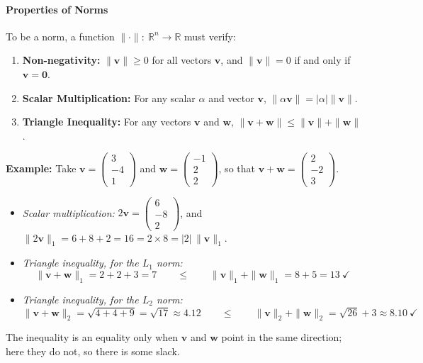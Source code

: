 \documentclass[]{article}
\newcommand{\R}{\mathbb{R}}
\begin{document}
	\paragraph{Properties of Norms}
	To be a norm, a function $\| \cdot \|: \ \R^n \to \R$ must verify:
	\begin{enumerate}
		\item \textbf{Non-negativity:}
		$\|\mathbf{v}\| \geq 0$ for all vectors $\mathbf{v}$, and $\|\mathbf{v}\| = 0$ if and only if $\mathbf{v} = \mathbf{0}$.
		\item \textbf{Scalar Multiplication:}
		For any scalar $\alpha$ and vector $\mathbf{v}$, $\|\alpha \mathbf{v}\| = |\alpha| \|\mathbf{v}\|$.
		\item \textbf{Triangle Inequality:}
		For any vectors $\mathbf{v}$ and $\mathbf{w}$, $\|\mathbf{v} + \mathbf{w}\| \leq \|\mathbf{v}\| + \|\mathbf{w}\|$.
	\end{enumerate}

	\noindent
	\textbf{Example:}
	Take $\mathbf{v} = \begin{pmatrix} 3 \\ -4 \\ 1 \end{pmatrix}$ and $\mathbf{w} = \begin{pmatrix} -1 \\ 2 \\ 2 \end{pmatrix}$, so that $\mathbf{v} + \mathbf{w} = \begin{pmatrix} 2 \\ -2 \\ 3 \end{pmatrix}$.
	\begin{itemize}
		\item \textit{Scalar multiplication:} $2\mathbf{v} = \begin{pmatrix} 6 \\ -8 \\ 2 \end{pmatrix}$, and $\|2\mathbf{v}\|_1 = 6 + 8 + 2 = 16 = 2 \times 8 = |2| \, \|\mathbf{v}\|_1$. \checkmark
		\item \textit{Triangle inequality, for the $L_1$ norm:}
		$$
		\|\mathbf{v} + \mathbf{w}\|_1 = 2 + 2 + 3 = 7
		\qquad \leq \qquad
		\|\mathbf{v}\|_1 + \|\mathbf{w}\|_1 = 8 + 5 = 13 \ \checkmark
		$$
		\item \textit{Triangle inequality, for the $L_2$ norm:}
		$$
		\|\mathbf{v} + \mathbf{w}\|_2 = \sqrt{4+4+9} = \sqrt{17} \approx 4.12
		\qquad \leq \qquad
		\|\mathbf{v}\|_2 + \|\mathbf{w}\|_2 = \sqrt{26} + 3 \approx 8.10 \ \checkmark
		$$
	\end{itemize}
	The inequality is an equality only when $\mathbf{v}$ and $\mathbf{w}$ point in the same direction; here they do not, so there is some slack.
\end{document}
